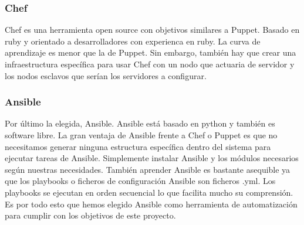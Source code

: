 	\subsubsection{Chef}
	\begin{text}
		Chef es una herramienta open source con objetivos similares a Puppet. Basado en ruby y orientado a desarrolladores con experienca en ruby. La curva de aprendizaje es menor que la de Puppet. Sin embargo, también hay que crear una infraestructura específica para usar Chef con un nodo que actuaria de servidor y los nodos esclavos que serían los servidores a configurar.
	\end{text}
	\subsubsection{Ansible}
	\begin{text}
		Por último la elegida, Ansible. Ansible está basado en python y también es software libre. La gran ventaja de Ansible frente a Chef o Puppet es que no necesitamos generar ninguna estructura específica dentro del sistema para ejecutar tareas de Ansible. Simplemente instalar Ansible y los módulos necesarios según nuestras necesidades. También aprender Ansible es bastante asequible ya que los playbooks o ficheros de configuración Ansible son ficheros .yml. Los playbooks se ejecutan en orden secuencial lo que facilita mucho su comprensión. Es por todo esto que hemos elegido Ansible como herramienta de automatización para cumplir con los objetivos de este proyecto.
	\end{text}
	
